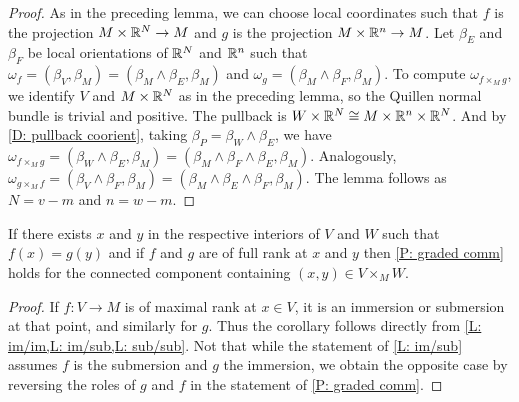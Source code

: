 \begin{proof}
	As in the preceding lemma, we can choose local coordinates such that $f$ is the projection $M \times \mathbb{R}^N \to M$ and $g$ is the projection $M \times \mathbb{R}^n \to M$.
	Let $\beta_E$ and $\beta_F$ be local orientations of $\mathbb{R}^N$ and $\mathbb{R}^n$ such that $\omega_f = (\beta_V,\beta_M) = (\beta_M \wedge \beta_E, \beta_M)$ and $\omega_g = (\beta_M \wedge \beta_F, \beta_M)$.
	To compute $\omega_{f \times_M g}$, we identify $V$ and $M \times \mathbb{R}^N$ as in the preceding lemma, so the Quillen normal bundle is trivial and positive.
	The pullback is $W \times \mathbb{R}^N \cong M \times \mathbb{R}^n \times \mathbb{R}^N$.
	And by \cref{D: pullback coorient}, taking $\beta_P = \beta_W \wedge \beta_E$, we have $\omega_{f \times_M g} = (\beta_W \wedge \beta_E, \beta_M) = (\beta_M \wedge \beta_F \wedge \beta_E, \beta_M)$.
	Analogously, $\omega_{g \times_M f} = (\beta_V \wedge \beta_F, \beta_M) = (\beta_M \wedge \beta_E \wedge \beta_F, \beta_M)$.
	The lemma follows as $N = v-m$ and $n = w-m$.
\end{proof}

\begin{corollary}\label{C: if full}
	If there exists $x$ and $y$ in the respective interiors of $V$ and $W$ such that $f(x) = g(y)$ and if $f$ and $g$ are of full rank at $x$ and $y$ then \cref{P: graded comm} holds for the connected component containing $(x,y) \in V \times_M W$.
\end{corollary}

\begin{proof}
	If $f \colon V \to M$ is of maximal rank at $x \in V$, it is an immersion or submersion at that point, and similarly for $g$.
	Thus the corollary follows directly from \cref{L: im/im,L: im/sub,L: sub/sub}.
	Not that while the statement of \cref{L: im/sub} assumes $f$ is the submersion and $g$ the immersion, we obtain the opposite case by reversing the roles of $g$ and $f$ in the statement of \cref{P: graded comm}.
\end{proof}

\begin{comment}
	If they are both immersions, apply Lemma \ref{L: im/im}.
	If $f$ is a submersion, it is also a submersion in a neighborhood of $U$ and so it is a submersion on a neighborhood $U$ of $x$.
	Let $A$ be the intersection of $U$ with the interior of $V$.
	By the transversality of $f$ and $g$, if $g(y) = f(x)$, there must be points in a neighborhood of $B$ of $y$ in $W$ that map to $f(A)$, and as a map is a submersion or immersion on an open set, there is a $y'$ in the interior of $B$ that maps to $f(A)$.
	Taking $x'$ in $f^{-1}(y')$, if $g$ is an immersion we apply Lemma \ref{L: im/sub} to $x', y'$, and if $g$ is a submersion we apply Lemma \ref{L: sub/sub}.
	If $f$ is an immersion and $g$ a submersion, we reverse the roles in the argument.
\end{comment}

